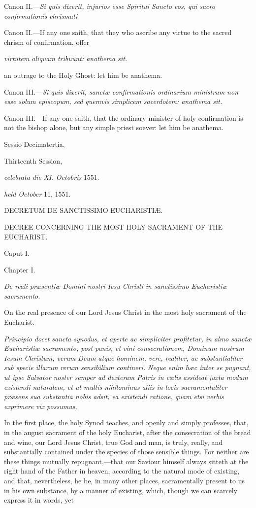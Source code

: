 Canon II.—\emph{Si quis dixerit, injurios esse Spiritui Sancto eos, qui sacro confirmationis chrismati}

Canon II.—If any one saith, that they who ascribe any virtue to the sacred chrism of confirmation, offer

\emph{virtutem aliquam tribuunt: anathema sit. }

an outrage to the Holy Ghost: let him be anathema.

Canon III.—\emph{Si quis dixerit, sanctæ confirmationis ordinarium ministrum non esse solum episcopum, sed quemvis simplicem sacerdotem: anathema sit.}

Canon III.—If any one saith, that the ordinary minister of holy confirmation is not the bishop alone, but any simple priest soever: let him be anathema.


Sessio Decimatertia,

Thirteenth Session,

\emph{celebrata die XI. Octobris} 1551.

\emph{held October} 11, 1551.

DECRETUM DE SANCTISSIMO EUCHARISTIÆ.

DECREE CONCERNING THE MOST HOLY SACRAMENT OF THE EUCHARIST.

Caput I.

Chapter I.

\emph{De reali præsentiæ Domini nostri Iesu Christi in sanctissimo Eucharistiæ sacramento.}

On the real presence of our Lord Jesus Christ in the most holy sacrament of the Eucharist.

\emph{Principio docet sancta synodus, et aperte ac simpliciter profitetur, in almo sanctæ Eucharistiæ sacramento, post panis, et vini consecrationem, Dominum nostrum Iesum Christum, verum Deum atque hominem, vere, realiter, ac substantialiter sub specie illarum rerum sensibilium contineri. Neque enim hæc inter se pugnant, ut ipse Salvator noster semper ad dexteram Patris in cœlis assideat juxta modum existendi naturalem, et ut multis nihilominus aliis in locis sacramentaliter præsens sua substantia nobis adsit, ea existendi ratione, quam etsi verbis exprimere vix possumus, }

In the first place, the holy Synod teaches, and openly and simply professes, that, in the august sacrament of the holy Eucharist, after the consecration of the bread and wine, our Lord Jesus Christ, true God and man, is truly, really, and substantially contained under the species of those sensible things. For neither are these things mutually repugnant,—that our Saviour himself always sitteth at the right hand of the Father in heaven, according to the natural mode of existing, and that, nevertheless, he be, in many other places, sacramentally present to us in his own substance, by a manner of existing, which, though we can scarcely express it in words, yet

